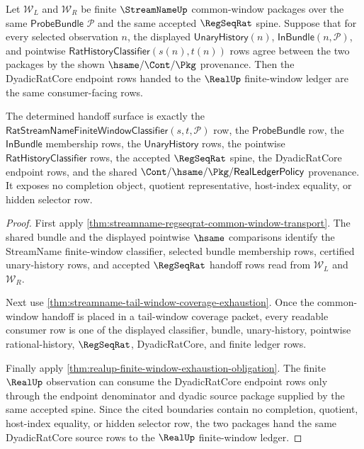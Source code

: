 \begin{theorem}
\label{thm:streamname-regseqrat-dyadic-source-determinacy}
Let $\mathcal W_L$ and $\mathcal W_R$ be finite $\StreamNameUp$ common-window
packages over the same $\mathsf{ProbeBundle}$ $\mathcal P$ and the same
accepted $\RegSeqRat$ spine. Suppose that for every selected observation $n$,
the displayed $\mathsf{UnaryHistory}(n)$, $\mathsf{InBundle}(n,\mathcal P)$,
and pointwise $\mathsf{RatHistoryClassifier}(s(n),t(n))$ rows agree between the
two packages by the shown $\hsame/\Cont/\Pkg$ provenance. Then the DyadicRatCore
endpoint rows handed to the $\RealUp$ finite-window ledger are the same
consumer-facing rows.

The determined handoff surface is exactly the
$\mathsf{RatStreamNameFiniteWindowClassifier}(s,t,\mathcal P)$ row, the
$\mathsf{ProbeBundle}$ row, the $\mathsf{InBundle}$ membership rows, the
$\mathsf{UnaryHistory}$ rows, the pointwise
$\mathsf{RatHistoryClassifier}$ rows, the accepted $\RegSeqRat$ spine, the
DyadicRatCore endpoint rows, and the shared
$\Cont/\hsame/\Pkg/\mathsf{RealLedgerPolicy}$ provenance. It exposes no
completion object, quotient representative, host-index equality, or hidden
selector row.
\end{theorem}
\begin{proof}
First apply \autoref{thm:streamname-regseqrat-common-window-transport}. The
shared bundle and the displayed pointwise $\hsame$ comparisons identify the
StreamName finite-window classifier, selected bundle membership rows, certified
unary-history rows, and accepted $\RegSeqRat$ handoff rows read from
$\mathcal W_L$ and $\mathcal W_R$.

Next use \autoref{thm:streamname-tail-window-coverage-exhaustion}. Once the
common-window handoff is placed in a tail-window coverage packet, every readable
consumer row is one of the displayed classifier, bundle, unary-history,
pointwise rational-history, $\RegSeqRat$, DyadicRatCore, and finite ledger rows.

Finally apply \autoref{thm:realup-finite-window-exhaustion-obligation}. The
finite $\RealUp$ observation can consume the DyadicRatCore endpoint rows only
through the endpoint denominator and dyadic source package supplied by the same
accepted spine. Since the cited boundaries contain no completion, quotient,
host-index equality, or hidden selector row, the two packages hand the same
DyadicRatCore source rows to the $\RealUp$ finite-window ledger.
\end{proof}


